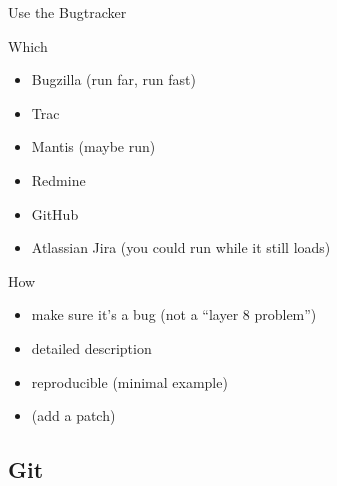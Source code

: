 \documentclass{beamer}
\begin{document}
\begin{frame}{Use the Bugtracker}
    \begin{block}{Which}
        \begin{itemize}
            \item Bugzilla (run far, run fast)
            \item Trac
            \item Mantis (maybe run)
            \item Redmine
            \item GitHub
            \item Atlassian Jira (you could run while it still loads)
        \end{itemize}
    \end{block}
    \pause
    \begin{block}{How}
        \begin{itemize}
            \item make sure it's a bug (not a \enquote{layer 8 problem})
            \item detailed description
            \item reproducible (minimal example)
            \item (add a patch)
        \end{itemize}
    \end{block}
\end{frame}

\subsection{Git}
\end{document}
